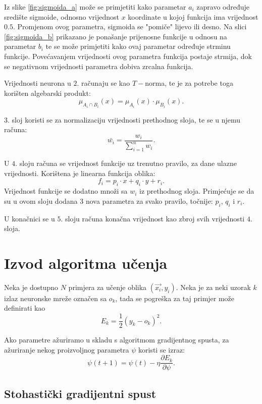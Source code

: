 \documentclass[12pt, a4paper, numeric]{article}
\begin{document}
Iz slike \ref{fig:sigmoida_a} može se primjetiti kako parametar $a_i$ zapravo određuje središte sigmoide, odnosno vrijednost $x$ koordinate u kojoj funkcija ima vrijednost $0.5$.
Promjenom ovog parametra, sigmoida se "pomiče" lijevo ili desno.
Na slici \ref{fig:sigmoida_b} prikazano je ponašanje prijenosne funkcije u odnosu na parametar $b_i$ te se može primjetiti kako ovaj parametar određuje strminu funkcije. 
Povećavanjem vrijednosti ovog parametra funkcija postaje strmija, dok se negativnom vrijednosti parametra dobiva zrcalna funkcija.

Vrijednosti neurona u $2.$ računaju se kao $T-$norma, te je za potrebe toga korišten algebarski produkt:
\[
    \mu_{A_i\cap B_i}(x) = \mu_{A_i}(x) \cdot \mu_{B_i}(x).
\]

$3.$ sloj koristi se za normalizaciju vrijednosti prethodnog sloja, te se u njemu računa:
\[
    \bar{w_i} = \frac{w_i}{\sum_{i=1}^{n} w_i}.
\]

U $4.$ sloju računa se vrijednost funkcije uz trenutno pravilo, za dane ulazne vrijednosti.
Korištena je linearna funkcija oblika: 
\[
    f_i = p_i\cdot x + q_i\cdot y + r_i.
\]
Vrijednost funkcije se dodatno množi sa $w_i$ iz prethodnog sloja.
Primjećuje se da su u ovom sloju dodana $3$ nova parametra za svako pravilo, točnije: $p_i$, $q_i$ i $r_i$.

U konačnici se u $5.$ sloju računa konačna vrijednost kao zbroj svih vrijednosti $4.$ sloja.

\section{Izvod algoritma učenja}
Neka je dostupno $N$ primjera za učenje oblika $(\vec{x_i}, y_i)$.
Neka je za neki uzorak $k$ izlaz neuronske mreže označen sa $o_k$, tada se pogreška za taj primjer može definirati kao 
\[
    E_k = \frac{1}{2}(y_k - o_k)^2.
\]

Ako parametre ažuriramo u skladu s algoritmom gradijentnog spusta, za ažuriranje nekog proizvoljnog parametra $\psi$ koristi se izraz:
\[
    \psi(t+1) = \psi(t) - \eta\frac{\partial E_k}{\partial\psi}.
\]

\subsection{Stohastički gradijentni spust}
\end{document}
